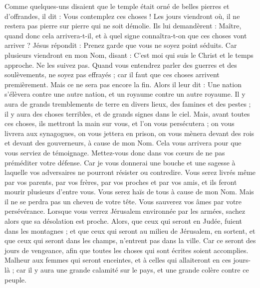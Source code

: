 \begin{multicols}{2}
Comme quelques-uns disaient que le temple était orné de belles pierres et d’offrandes, il dit :
Vous contemplez ces choses ! Les jours viendront où, il ne restera pas pierre sur pierre qui ne soit démolie.
Ils lui demandèrent : Maître, quand donc cela arrivera-t-il, et à quel signe connaîtra-t-on que ces choses vont arriver ?
Jésus répondit : Prenez garde que vous ne soyez point séduits. Car plusieurs viendront en mon Nom, disant : C’est moi qui suis le Christ et le temps approche. Ne les suivez pas.
Quand vous entendrez parler des guerres et des soulèvements, ne soyez pas effrayés ; car il faut que ces choses arrivent premièrement. Mais ce ne sera pas encore la fin.
Alors il leur dit : Une nation s'élèvera contre une autre nation, et un royaume contre un autre royaume.
Il y aura de grands tremblements de terre en divers lieux, des famines et des pestes ; il y aura des choses terribles, et de grands signes dans le ciel.
Mais, avant toutes ces choses, ils mettront la main sur vous, et l’on vous persécutera ; on vous livrera aux synagogues, on vous jettera en prison, on vous mènera devant des rois et devant des gouverneurs, à cause de mon Nom.
Cela vous arrivera pour que vous serviez de témoignage.
Mettez-vous donc dans vos cœurs de ne pas préméditer votre défense.
Car je vous donnerai une bouche et une sagesse à laquelle vos adversaires ne pourront résister ou contredire.
Vous serez livrés même par vos parents, par vos frères, par vos proches et par vos amis, et ils feront mourir plusieurs d'entre vous.
Vous serez haïs de tous à cause de mon Nom.
Mais il ne se perdra pas un cheveu de votre tête.
Vous sauverez vos âmes par votre persévérance.
Lorsque vous verrez Jérusalem environnée par les armées, sachez alors que sa désolation est proche.
Alors, que ceux qui seront en Judée, fuient dans les montagnes ; et que ceux qui seront au milieu de Jérusalem, en sortent, et que ceux qui seront dans les champs, n'entrent pas dans la ville.
Car ce seront des jours de vengeance, afin que toutes les choses qui sont écrites soient accomplies.
Malheur aux femmes qui seront enceintes, et à celles qui allaiteront en ces jours-là ; car il y aura une grande calamité sur le pays, et une grande colère contre ce peuple.

\end{multicols}

